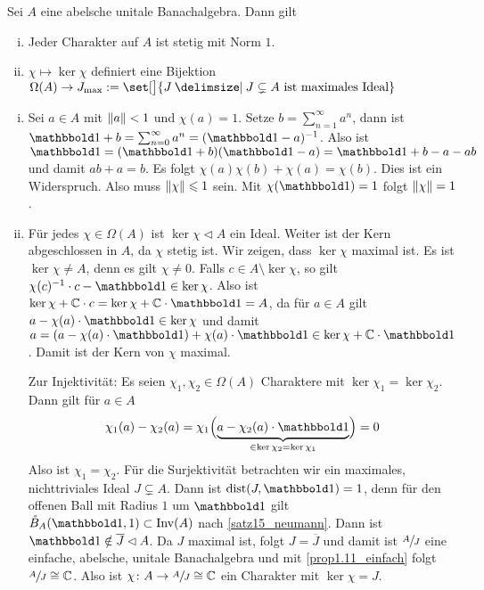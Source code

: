 \begin{satz}[label=satz:1.13,{name=[Stetigkeit von Charakteren, Zusammenhang mit maximalen Idealen]}]
	Sei $A$ eine abelsche unitale Banachalgebra. Dann gilt
	\begin{enumerate}[(i),itemsep=0pt]
		\item Jeder Charakter auf $A$ ist stetig mit Norm $1$.
		\item $\chi \mapsto \ker \chi$ definiert eine Bijektion  
		\(
			\Omega(A) \to J_{\max} := \set[\big]{J \given J \subsetneq A \text{ ist maximales Ideal} }
		\)
	\end{enumerate}
\end{satz}
\begin{beweis} \leavevmode
	\begin{enumerate}[(i)]
		\item Sei $a \in A$ mit $\Vert a\Vert<1$ und $\chi(a)=1$. 
		Setze $b= \sum_{n=1}^{\infty} a^n$, dann ist $\ind + b = \sum_{n=0}^{\infty} a^n = (\ind-a)^{-1}$. 
		Also ist $\ind = (\ind+b)(\ind-a) = \ind + b -a -ab$ und damit $ab+a=b$. 
		Es folgt $\chi(a)\chi(b) + \chi(a)= \chi(b)$. Dies ist ein Widerspruch. Also muss $\Vert\chi\Vert\leqslant 1$ sein. 
		Mit $\chi(\ind)=1$ folgt $\Vert\chi\Vert=1$. 
		\item Für jedes $\chi \in \Omega(A)$ ist $\ker \chi \lhd A$ ein Ideal. 
		Weiter ist der Kern abgeschlossen in $A$, da $\chi$ stetig ist. 
		Wir zeigen, dass $\ker \chi$ maximal ist. 
		Es ist $\ker \chi \neq A$, denn es gilt $\chi \neq 0$. 
		Falls $c \in A \setminus \ker \chi$, so gilt 
		\(
			\chi(c)^{-1} \cdot c-\ind \in \ker \chi
		\).
		Also ist $\ker \chi + \mathbb{C} \cdot c = \ker \chi + \mathbb{C} \cdot \ind=A$, da für $a \in A$ gilt $a- \chi(a) \cdot \ind \in \ker \chi$ und damit 
		$a= \enbrace*{a- \chi(a) \cdot \ind}+ \chi(a) \cdot \ind \in \ker \chi + \mathbb{C} \cdot \ind$. 
		Damit ist der Kern von $\chi$ maximal.
		
		Zur Injektivität: Es seien $\chi_1, \chi_2 \in \Omega(A)$ Charaktere mit $\ker \chi_1 = \ker \chi_2$. Dann gilt für $a \in A$
		\begin{align}
			\chi_1(a) - \chi_2(a) = \chi_1 \enbrace[\Big]{\Underbrace{a - \chi_2(a) \cdot \ind}{\in \ker \chi_2=\ker \chi_1}} = 0
		\end{align}
		Also ist $\chi_1=\chi_2$. Für die Surjektivität betrachten wir ein maximales, nichttriviales Ideal $J \subsetneq A$. 
		Dann ist $\dist \enbrace*{J,\ind}=1$, denn für den offenen Ball mit Radius $1$ um $\ind$ gilt $\mathring{B}_A(\ind,1) \subset \Inv(A)$ nach \autoref{satz15_neumann}. 
		Dann ist $\ind \notin \overline{J} \lhd A$. 
		Da $J$ maximal ist, folgt $J=\overline{J}$ und damit ist 
		$\sfrac{A}{J}$ eine einfache, abelsche, unitale Banachalgebra und mit \autoref{prop1.11_einfach} folgt $\sfrac{A}{J} \cong \mathbb{C}$. Also ist 
		$\chi \colon A \to \sfrac{A}{J} \cong \mathbb{C}$ ein Charakter mit $\ker \chi= J$. \qedhere
	\end{enumerate}
\end{beweis}

